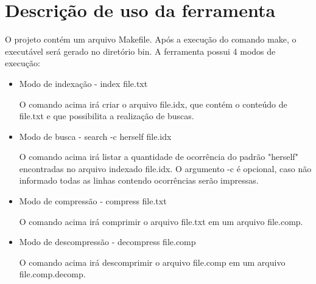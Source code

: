 \section{Descrição de uso da ferramenta \ipmt}

O projeto contém um arquivo Makefile. Após a execução do comando make, o
executável \ipmt será gerado no diretório bin. A ferramenta \ipmt possui 4 modos
de execução:

\begin{itemize}

\item Modo de indexação - \ipmt index file.txt

    O comando acima irá criar o arquivo file.idx, que contém o conteúdo de
    file.txt e que possibilita a realização de buscas.

\item Modo de busca - \ipmt search -c herself file.idx

    O comando acima irá listar a quantidade de ocorrência do padrão "herself"
    encontradas no arquivo indexado file.idx. O argumento -c é opcional, caso
    não informado todas as linhas contendo ocorrências serão impressas.

\item Modo de compressão - \ipmt compress file.txt

    O comando acima irá comprimir o arquivo file.txt em um arquivo file.comp.

\item Modo de descompressão - \ipmt decompress file.comp

    O comando acima irá descomprimir o arquivo file.comp em um arquivo
    file.comp.decomp.

\end{itemize}
